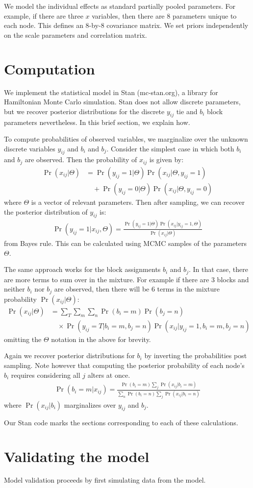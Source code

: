 \documentclass[reqno,12pt,a4paper]{amsart}
\begin{document}
We model the individual effects as standard partially pooled parameters. For example, if there are three $x$ variables, then there are 8 parameters unique to each node. This defines an 8-by-8 covariance matrix. We set priors independently on the scale parameters and correlation matrix.

\section{Computation}

We implement the statistical model in Stan (mc-stan.org), a library for Hamiltonian Monte Carlo simulation. Stan does not allow discrete parameters, but we recover posterior distributions for the discrete $y_{ij}$ tie and $b_i$ block parameters nevertheless. In this brief section, we explain how.

To compute probabilities of observed variables, we marginalize over the unknown discrete variables $y_{ij}$ and $b_i$ and $b_j$. Consider the simplest case in which both $b_i$ and $b_j$ are observed. Then the probability of $x_{ij}$ is given by:
\begin{align*}
	\Pr(x_{ij}|\Theta) &= \Pr(y_{ij}=1|\Theta)\Pr(x_{ij}|\Theta,y_{ij}=1) \\
	&\quad + \Pr(y_{ij}=0|\Theta)\Pr(x_{ij}|\Theta,y_{ij}=0)
\end{align*}
where $\Theta$ is a vector of relevant parameters. Then after sampling, we can recover the posterior distribution of $y_{ij}$ is:
\begin{align*}
	\Pr(y_{ij}=1|x_{ij},\Theta) = \frac{\Pr(y_{ij}=1|\Theta)\Pr(x_{ij}|y_{ij}=1,\Theta)}{\Pr(x_{ij}|\Theta)}
\end{align*}
from Bayes rule. This can be calculated using MCMC samples of the parameters $\Theta$.

The same approach works for the block assignments $b_i$ and $b_j$. In that case, there are more terms to sum over in the mixture. For example if there are 3 blocks and neither $b_i$ nor $b_j$ are observed, then there will be 6 terms in the mixture probability $\Pr(x_{ij}|\Theta)$:
\begin{align*}
	\Pr(x_{ij}|\Theta) &= \sum_T \sum_m \sum_n \Pr(b_i=m) \Pr(b_j=n) \\
	& \quad \times \Pr(y_{ij}=T|b_i=m,b_j=n)   \Pr(x_{ij}|y_{ij}=1,b_i=m,b_j=n)
\end{align*}
omitting the $\Theta$ notation in the above for brevity. 

Again we recover posterior distributions for $b_i$ by inverting the probabilities post sampling. Note however that computing the posterior probability of each node's $b_i$ requires considering all $j$ alters at once.
\begin{align*}
	\Pr(b_i=m|x_{ij}) = \frac{ \Pr(b_i=m) \sum_j \Pr(x_{ij}|b_i=m) }{ \sum_n \Pr(b_i=n) \sum_j \Pr(x_{ij}|b_i=n) }
\end{align*}
where $\Pr(x_{ij}|b_i)$ marginalizes over $y_{ij}$ and $b_j$.

Our Stan code marks the sections corresponding to each of these calculations.

\section{Validating the model}

Model validation proceeds by first simulating data from the model. 


%
%
\end{document}
